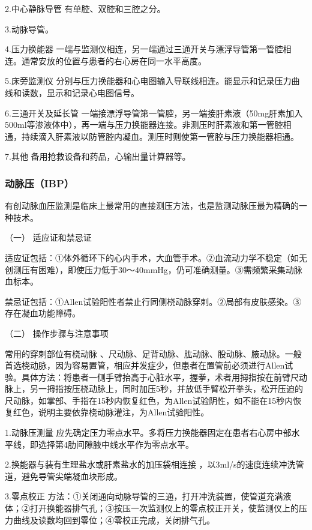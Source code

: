 2.中心静脉导管 有单腔、双腔和三腔之分。

3.动脉导管。

4.压力换能器
一端与监测仪相连，另一端通过三通开关与漂浮导管第一管腔相连。通常安放的位置与患者的右心房在同一水平高度。

5.床旁监测仪
分别与压力换能器和心电图输入导联线相连。能显示和记录压力曲线和读数，显示和记录心电图信号。

6.三通开关及延长管
一端接漂浮导管第一管腔，另一端接肝素液（50mg肝素加入500ml等渗液体中），再一端与压力换能器连接。非测压时肝素液和第一管腔相通，持续滴入肝素液以防管腔内凝血。测压时则使第一管腔与压力换能器相通。

7.其他 备用抢救设备和药品，心输出量计算器等。

\subsubsection{动脉压（IBP）}

有创动脉血压监测是临床上最常用的直接测压方法，也是监测动脉压最为精确的一种技术。

\hypertarget{text00376.htmlux5cux23CHP16-6-3-1}{}
（一） 适应证和禁忌证

适应证包括：①体外循环下的心内手术，大血管手术。②血流动力学不稳定（如无创测压有困难），即使压力低于30～40mmHg，仍可准确测量。③需频繁采集动脉血标本。

禁忌证包括：①Allen试验阳性者禁止行同侧桡动脉穿刺。②局部有皮肤感染。③存在凝血功能障碍。

\hypertarget{text00376.htmlux5cux23CHP16-6-3-2}{}
（二） 操作步骤与注意事项

常用的穿刺部位有桡动脉
、尺动脉、足背动脉、肱动脉、股动脉、腋动脉。一般首选桡动脉，因为容易置管，相应并发症少，但患者在置管前必须进行Allen试验。具体方法：将患者一侧手臂抬高于心脏水平，握拳，术者用拇指按在前臂尺动脉上，另一拇指按压桡动脉上，同时加压5秒，并放低手臂松开拳头，松开压迫的尺动脉，如掌部、手指在15秒内恢复红色，为Allen试验阴性，如不能在15秒内恢复红色，说明主要依靠桡动脉灌注，为Allen试验阳性。

1.动脉压测量
应先确定压力零点水平。多将压力换能器固定在患者右心房中部水平线，即选择第4肋间隙腋中线水平作为零点水平。

2.换能器与装有生理盐水或肝素盐水的加压袋相连接
，以3ml/s的速度连续冲洗管道，避免导管尖端凝血块形成。

3.零点校正
方法：①关闭通向动脉导管的三通，打开冲洗装置，使管道充满液体；②打开换能器排气孔；③按压一次监测仪上的零点校正开关，使监测仪上的压力曲线及读数均回到零位；④零校正完成，关闭排气孔。

